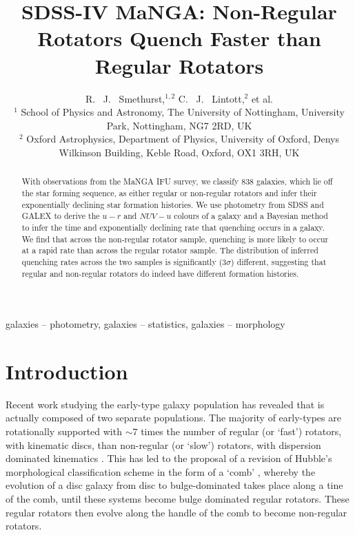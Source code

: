 \documentclass[useAMS,usenatbib]{mn2e}
\begin{document}
\title[Quenching Histories of Regular and Non-Regular Rotators]{SDSS-IV MaNGA: Non-Regular Rotators Quench Faster than Regular Rotators}
\author[Smethurst et al. 2017]{R. ~J. ~Smethurst,$^{1,2}$ C. ~J. ~Lintott,$^{2}$ et al.
\\ $^1$ School of Physics and Astronomy, The University of Nottingham, University Park, Nottingham, NG7 2RD, UK
\\ $^2$ Oxford Astrophysics, Department of Physics, University of Oxford, Denys Wilkinson Building, Keble Road, Oxford, OX1 3RH, UK
}

\maketitle

\begin{abstract}
With observations from the MaNGA IFU survey, we classify $838$ galaxies, which lie off the star forming sequence, as either regular or non-regular rotators and infer their exponentially declining star formation histories. We use photometry from SDSS and GALEX to derive the $u-r$ and $NUV-u$ colours of a galaxy and a Bayesian method to infer the time and exponentially declining rate that quenching occurs in a galaxy. We find that across the non-regular rotator sample, quenching is more likely to occur at a rapid rate than across the regular rotator sample. The distribution of inferred quenching rates across the two samples is significantly ($3\sigma$) different, suggesting that regular and non-regular rotators do indeed have different formation histories.
\end{abstract}

\begin{keywords}
galaxies -- photometry, galaxies -- statistics, galaxies -- morphology
\end{keywords}

\section{Introduction}\label{sec:intro}

Recent work studying the early-type galaxy population has revealed that is actually composed of two separate populations. The majority of early-types are rotationally supported \citep{emsellem11} with $\sim7$ times the number of regular (or `fast') rotators, with kinematic discs, than non-regular (or `slow') rotators, with dispersion dominated kinematics \citep{cappellari07, emsellem07}.  This has led to the proposal of a revision of Hubble's morphological classification scheme in the form of a `comb' \citep{cappellari16}, whereby the evolution of a disc galaxy from  disc to bulge-dominated takes place along a tine of the comb, until these systems become bulge dominated regular rotators. These regular rotators then evolve along the handle of the comb to become non-regular rotators. 
\end{document}
